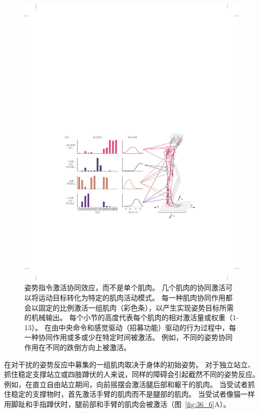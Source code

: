 \begin{figure}[htbp]
	\centering
	\includegraphics[width=0.95\linewidth]{chap36/fig_36_5}
	\caption{姿势指令激活协同效应，而不是单个肌肉。
		几个肌肉的协同激活可以将运动目标转化为特定的肌肉活动模式。
		每一种肌肉协同作用都会以固定的比例激活一组肌肉（彩色条），以产生实现姿势目标所需的机械输出。
		每个小节的高度代表每个肌肉的相对激活量或权重（1-13）。
		在由中央命令和感觉驱动（招募功能）驱动的行为过程中，每一种协同作用或多或少在特定时间被激活。
		例如，不同的姿势协同作用在不同的跌倒方向上被激活。}
	\label{fig:36_5}
\end{figure}


在对干扰的姿势反应中募集的一组肌肉取决于身体的初始姿势。
对于独立站立、抓住稳定支撑站立或四肢蹲伏的人来说，同样的障碍会引起截然不同的姿势反应。
例如，在直立自由站立期间，向前摇摆会激活腿后部和躯干的肌肉。
当受试者抓住稳定的支撑物时，首先激活手臂的肌肉而不是腿部的肌肉。
当受试者像猫一样用脚趾和手指蹲伏时，腿前部和手臂的肌肉会被激活（图~\ref{fig:36_6}A）。


